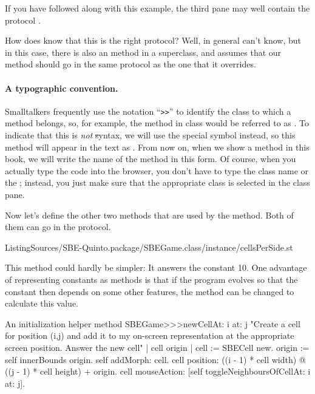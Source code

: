 \documentclass[a4paper,10pt,twoside]{book}
\begin{document}
If you have followed along with this example, the third pane may well contain the protocol .

How does \squeak{} know that this is the right protocol?
Well, in general \squeak{} can't know, but in this case, there is also an  method in a superclass, and \squeak assumes that our  method should go in the same protocol as the one that it overrides.

\paragraph{A typographic convention.}
Smalltalkers frequently use the notation ``\verb|>>|'' to identify the class to which a method belongs, so, for example, the  method in class  would be referred to as .
To indicate that this is \emph{not} \st syntax, we will use the special symbol \ct{>>>} instead, so this method will appear in the text as .
From now on, when we show a method in this book, we will write the name of the method in this form.
Of course, when you actually type the code into the browser, you don't have to type the class name or the \ct{>>>}; instead, you just make sure that the appropriate class is selected in the class pane.  

Now let's define the other two methods that are used by the  method.
Both of them can go in the  protocol.

%
{ListingSources/SBE-Quinto.package/SBEGame.class/instance/cellsPerSide.st}	

This method could hardly be simpler:
It answers the constant 10.
One advantage of representing constants as methods is that if the program evolves so that the constant then depends on some other features, the method can be changed to calculate this value.

\begin{method}[newCellAt:at:]{An initialization helper method}
SBEGame>>>newCellAt: i at: j 
	"Create a cell for position (i,j) and add it to my on-screen
	representation at the appropriate screen position.  Answer the new cell"
	| cell origin |
	cell := SBECell new.
	origin := self innerBounds origin.
	self addMorph: cell.
	cell position: ((i - 1) * cell width) @ ((j - 1) * cell height) + origin.
	cell mouseAction: [self toggleNeighboursOfCellAt: i at: j].
\end{method}
\end{document}
